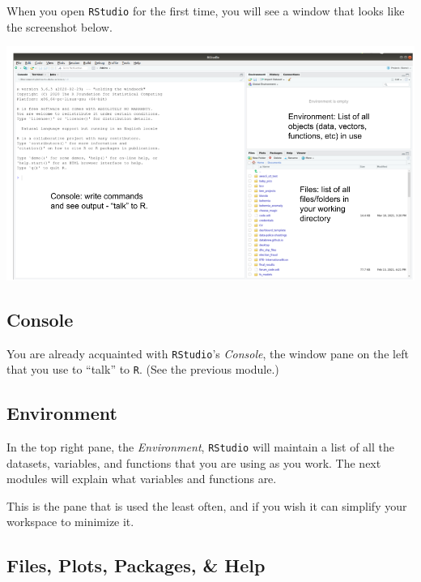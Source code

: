 \documentclass[
]{book}
\begin{document}
When you open \texttt{RStudio} for the first time, you will see a window that looks like the screenshot below.

\includegraphics{img/rstudio_windows.png}

\hypertarget{console}{%
\subsection*{Console}\label{console}}

You are already acquainted with \texttt{RStudio}'s \emph{Console}, the window pane on the left that you use to ``talk'' to \texttt{R}. (See the previous module.)

\hypertarget{environment}{%
\subsection*{Environment}\label{environment}}

In the top right pane, the \emph{Environment}, \texttt{RStudio} will maintain a list of all the datasets, variables, and functions that you are using as you work. The next modules will explain what variables and functions are.

This is the pane that is used the least often, and if you wish it can simplify your workspace to minimize it.

\hypertarget{files-plots-packages-help}{%
\subsection*{Files, Plots, Packages, \& Help}\label{files-plots-packages-help}}
\end{document}
